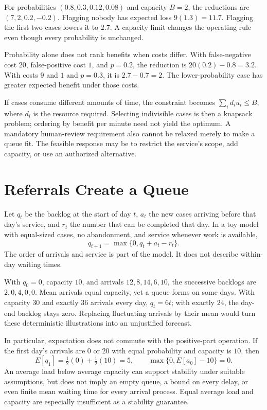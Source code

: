 For probabilities $(0.8,0.3,0.12,0.08)$ and capacity $B=2$, the reductions are $(7,2,0.2,-0.2)$. Flagging nobody has expected loss $9(1.3)=11.7$. Flagging the first two cases lowers it to $2.7$. A capacity limit changes the operating rule even though every probability is unchanged.

Probability alone does not rank benefits when costs differ. With false-negative cost $20$, false-positive cost $1$, and $p=0.2$, the reduction is $20(0.2)-0.8=3.2$. With costs $9$ and $1$ and $p=0.3$, it is $2.7-0.7=2$. The lower-probability case has greater expected benefit under those costs.

If cases consume different amounts of time, the constraint becomes $\sum_i d_i u_i\le B$, where $d_i$ is the resource required. Selecting indivisible cases is then a knapsack problem; ordering by benefit per minute need not yield the optimum. A mandatory human-review requirement also cannot be relaxed merely to make a queue fit. The feasible response may be to restrict the service's scope, add capacity, or use an authorized alternative.

\section{Referrals Create a Queue}
\label{subsec:queue-capacity-threshold}

Let $q_t$ be the backlog at the start of day $t$, $a_t$ the new cases arriving before that day's service, and $r_t$ the number that can be completed that day. In a toy model with equal-sized cases, no abandonment, and service whenever work is available,
\[
q_{t+1}=\max\{0,q_t+a_t-r_t\}.
\]
The order of arrivals and service is part of the model. It does not describe within-day waiting times.

With $q_0=0$, capacity $10$, and arrivals $12,8,14,6,10$, the successive backlogs are $2,0,4,0,0$. Mean arrivals equal capacity, yet a queue forms on some days. With capacity $30$ and exactly $36$ arrivals every day, $q_t=6t$; with exactly $24$, the day-end backlog stays zero. Replacing fluctuating arrivals by their mean would turn these deterministic illustrations into an unjustified forecast.

In particular, expectation does not commute with the positive-part operation. If the first day's arrivals are $0$ or $20$ with equal probability and capacity is $10$, then
\[
E[q_1]=\tfrac12(0)+\tfrac12(10)=5,
\qquad
\max\{0,E[a_0]-10\}=0.
\]
An average load below average capacity can support stability under suitable assumptions, but does not imply an empty queue, a bound on every delay, or even finite mean waiting time for every arrival process. Equal average load and capacity are especially insufficient as a stability guarantee.

